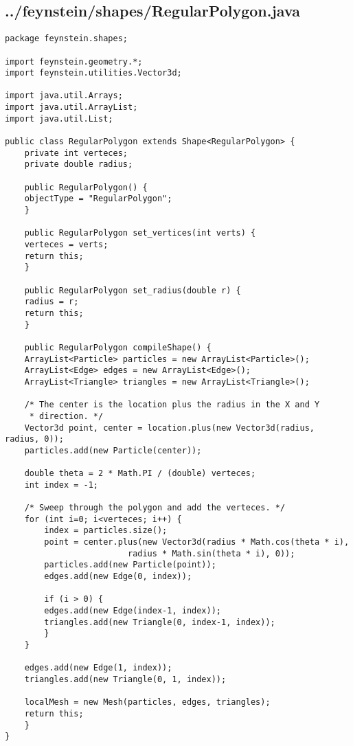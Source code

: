 \subsection*{../feynstein/shapes/RegularPolygon.java}
\begin{lstlisting}
package feynstein.shapes;

import feynstein.geometry.*;
import feynstein.utilities.Vector3d;

import java.util.Arrays;
import java.util.ArrayList;
import java.util.List;

public class RegularPolygon extends Shape<RegularPolygon> {
    private int verteces;
    private double radius;

    public RegularPolygon() {
	objectType = "RegularPolygon";
    }

    public RegularPolygon set_vertices(int verts) {
	verteces = verts;
	return this;
    }

    public RegularPolygon set_radius(double r) {
	radius = r;
	return this;
    }

    public RegularPolygon compileShape() {
	ArrayList<Particle> particles = new ArrayList<Particle>();
	ArrayList<Edge> edges = new ArrayList<Edge>();
	ArrayList<Triangle> triangles = new ArrayList<Triangle>();

	/* The center is the location plus the radius in the X and Y
	 * direction. */
	Vector3d point, center = location.plus(new Vector3d(radius, radius, 0));
	particles.add(new Particle(center));

	double theta = 2 * Math.PI / (double) verteces;
	int index = -1;

	/* Sweep through the polygon and add the verteces. */
	for (int i=0; i<verteces; i++) {
	    index = particles.size();
	    point = center.plus(new Vector3d(radius * Math.cos(theta * i),
					     radius * Math.sin(theta * i), 0));
	    particles.add(new Particle(point));
	    edges.add(new Edge(0, index));

	    if (i > 0) {
		edges.add(new Edge(index-1, index));
		triangles.add(new Triangle(0, index-1, index));
	    }
	}
	
	edges.add(new Edge(1, index));
	triangles.add(new Triangle(0, 1, index));

	localMesh = new Mesh(particles, edges, triangles);
	return this;
    }
}\end{lstlisting}

